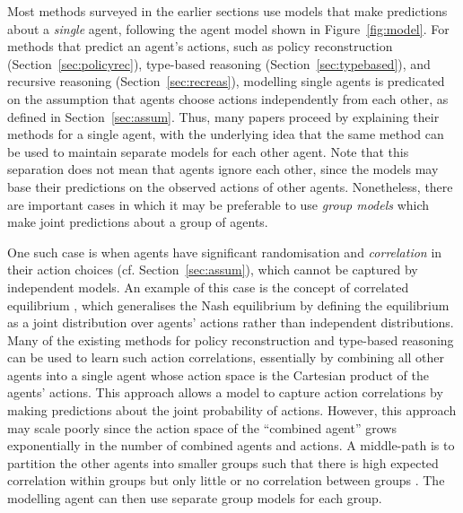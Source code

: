 \documentclass[final,1p,times,authoryear]{elsarticle}
\begin{document}
Most methods surveyed in the earlier sections use models that make predictions about a \emph{single} agent, following the agent model shown in Figure~\ref{fig:model}. For methods that predict an agent's actions, such as policy reconstruction (Section~\ref{sec:policyrec}), type-based reasoning (Section~\ref{sec:typebased}), and recursive reasoning (Section~\ref{sec:recreas}), modelling single agents is predicated on the assumption that agents choose actions independently from each other, as defined in Section~\ref{sec:assum}. Thus, many papers proceed by explaining their methods for a single agent, with the underlying idea that the same method can be used to maintain separate models for each other agent. Note that this separation does not mean that agents ignore each other, since the models may base their predictions on the observed actions of other agents. Nonetheless, there are important cases in which it may be preferable to use \emph{group models} which make joint predictions about a group of agents.

One such case is when agents have significant randomisation and \emph{correlation} in their action choices (cf. Section~\ref{sec:assum}), which cannot be captured by independent models. An example of this case is the concept of correlated equilibrium \citep{a1974}, which generalises the Nash equilibrium by defining the equilibrium as a joint distribution over agents' actions rather than independent distributions. Many of the existing methods for policy reconstruction and type-based reasoning can be used to learn such action correlations, essentially by combining all other agents into a single agent whose action space is the Cartesian product of the agents' actions. This approach allows a model to capture action correlations by making predictions about the joint probability of actions. However, this approach may scale poorly since the action space of the ``combined agent'' grows exponentially in the number of combined agents and actions. A middle-path is to partition the other agents into smaller groups such that there is high expected correlation within groups but only little or no correlation between groups \citep[an approach commonly used in probabilistic state estimation, e.g.][]{ar2016jair,bk1998}. The modelling agent can then use separate group models for each group.
\end{document}
